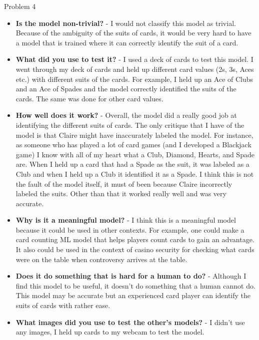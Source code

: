 \begin{problem}{Problem 4}
\begin{Highlight}[Solution]
\begin{spacing}{1.50}
            \begin{itemize}
                \item \textbf{Is the model non-trivial?} - I would not classify this model as trivial. Because of the ambiguity of the suits of cards, it would be very hard to have a model that is 
                trained where it can correctly identify the suit of a card.
                \item \textbf{What did you use to test it?} - I used a deck of cards to test this model. I went through my deck of cards and held up different card values (2s, 3s, Aces etc.) with
                different suits of the cards. For example, I held up an Ace of Clubs and an Ace of Spades and the model correctly identified the suits of the cards. The same was done for other card
                values.
                \item \textbf{How well does it work?} - Overall, the model did a really good job at identifying the different suits of cards. The only critique that I have of the model is that Claire
                might have inaccurately labeled the model. For instance, as someone who has played a lot of card games (and I developed a Blackjack game) I know with all of my heart what a Club, Diamond,
                Hearts, and Spade are. When I held up a card that had a Spade as the suit, it was labeled as a Club and when I held up a Club it identified it as a Spade. I think this is not the fault of
                the model itself, it must of been because Claire incorrectly labeled the suits. Other than that it worked really well and was very accurate.
                \item \textbf{Why is it a meaningful model?} - I think this is a meaningful model because it could be used in other contexts. For example, one could make a card counting ML model that
                helps players count cards to gain an advantage. It also could be used in the context of casino security for checking what cards were on the table when controversy arrives at the table.
                \item \textbf{Does it do something that is hard for a human to do?} - Although I find this model to be useful, it doesn't do something that a human cannot do. This model may be accurate
                but an experienced card player can identify the suits of cards with rather ease.
                \item \textbf{What images did you use to test the other's models?} - I didn't use any images, I held up cards to my webcam to test the model.
            \end{itemize}
        \end{spacing}
        \vspace*{-0.5em}
    \end{Highlight}


\end{problem}
